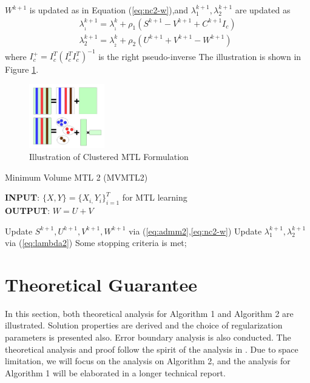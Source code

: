 \documentclass[twoside,leqno,twocolumn]{article}
\begin{document}
$W^{k+1}$ is updated as in Equation (\ref{eq:nc2-w}),and ${\lambda^{k + 1}_{1}}, {\lambda^{k + 1}_{2}}$ are updated as
\begin{equation}
\begin{array}{*{20}{l}}
{\lambda _{_1}^{k + 1} = \lambda _{_1}^k + {\rho _1}({S^{k + 1}} - {V^{k + 1}} + {C^{k + 1}}{I_c})}\\
{\lambda _2^{k + 1} = \lambda _{_2}^k + {\rho _2}({U^{k + 1}} + {V^{k + 1}} - {W^{k + 1}})}
\end{array}
\label{eq:lambda3}
\end{equation}
where $I_c^ +  = I_c^T{(I_c^TI_c^T)^{ - 1}}$ is the right pseudo-inverse
The illustration is shown in Figure \ref{fig:mtl-cluster}.
\begin{figure}[!htb]
\includegraphics[width= .5\textwidth, height=1.1in]{figures/mtl-cluster.pdf}
\caption{Illustration of Clustered MTL Formulation}
\label{fig:mtl-cluster}
\end{figure}
%
%
%
\begin{algorithm}
\label{alg:mvmtl2}
\caption{Minimum Volume MTL 2 (MVMTL2) }
\textbf{INPUT}: $\{X,Y\}=\{X_{i,}Y_{i}\}_{i=1}^{T}$ for MTL learning\\
\textbf{OUTPUT}: $W=U+V$
\begin{algorithmic}[1]
\REPEAT
\STATE Update ${S^{k+1}},{U^{k+1}},{V^{k+1}},{W^{k+1}}$ via (\ref{eq:admm2},\ref{eq:nc2-w})
\STATE Update $\lambda^{k+1}_{1},\lambda^{k+1}_{2}$ via (\ref{eq:lambda2}) 
\UNTIL Some stopping criteria is met;
\end{algorithmic}
\end{algorithm}



\section{Theoretical Guarantee}

In this section, both theoretical analysis for Algorithm 1 and Algorithm 2 are illustrated. Solution properties are derived and the choice of regularization parameters is presented also.
 Error boundary analysis is also conducted. The theoretical analysis and proof follow the spirit of the analysis in \cite{mtl:kdd2011:ChenZY11}.
Due to space limitation, we will focus on the analysis on Algorithm 2, and the analysis for Algorithm 1 will be elaborated in a longer technical report.
\end{document}
